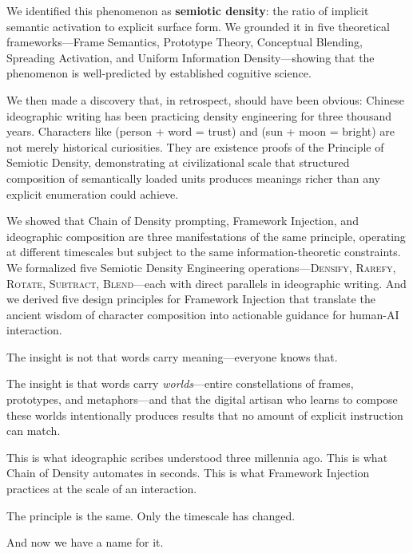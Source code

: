 \documentclass[12pt,a4paper]{article}
\begin{document}
We identified this phenomenon as \textbf{semiotic density}: the ratio of implicit semantic activation to explicit surface form.
We grounded it in five theoretical frameworks---Frame Semantics, Prototype Theory, Conceptual Blending, Spreading Activation, and Uniform Information Density---showing that the phenomenon is well-predicted by established cognitive science.

We then made a discovery that, in retrospect, should have been obvious: Chinese ideographic writing has been practicing density engineering for three thousand years.
Characters like  (person + word = trust) and  (sun + moon = bright) are not merely historical curiosities.
They are existence proofs of the Principle of Semiotic Density, demonstrating at civilizational scale that structured composition of semantically loaded units produces meanings richer than any explicit enumeration could achieve.

We showed that Chain of Density prompting, Framework Injection, and ideographic composition are three manifestations of the same principle, operating at different timescales but subject to the same information-theoretic constraints.
We formalized five Semiotic Density Engineering operations---\textsc{Densify}, \textsc{Rarefy}, \textsc{Rotate}, \textsc{Subtract}, \textsc{Blend}---each with direct parallels in ideographic writing.
And we derived five design principles for Framework Injection that translate the ancient wisdom of character composition into actionable guidance for human-AI interaction.

The insight is not that words carry meaning---everyone knows that.

The insight is that words carry \textit{worlds}---entire constellations of frames, prototypes, and metaphors---and that the digital artisan who learns to compose these worlds intentionally produces results that no amount of explicit instruction can match.

This is what ideographic scribes understood three millennia ago.
This is what Chain of Density automates in seconds.
This is what Framework Injection practices at the scale of an interaction.

The principle is the same.
Only the timescale has changed.

And now we have a name for it.
\end{document}
